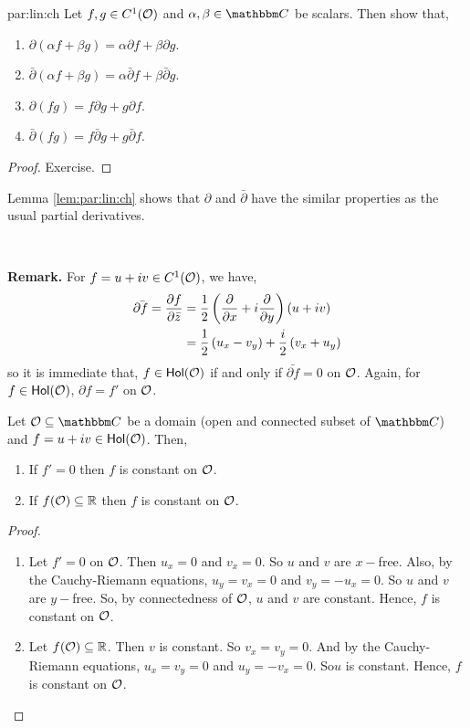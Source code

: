 \documentclass[../ComplexAnalysis_Notes.tex]{subfiles}
\begin{document}
\begin{Lem}{}{par:lin:ch}
  Let \(f, g \in C^1(\mathcal{O})\) and \(\alpha, \beta \in \C\) be scalars. Then show that,
  \begin{enumerate}
    \item \(\partial(\alpha f + \beta g) =  \alpha \partial f + \beta \partial g\).
    \item \(\bar{\partial}(\alpha f + \beta g) =  \alpha \bar{\partial} f + \beta \bar{\partial} g\).
    \item \(\partial(fg) = f \partial g + g \partial f\).
    \item \(\bar{\partial}(fg) = f \bar{\partial} g + g \bar{\partial} f\).
  \end{enumerate}
\end{Lem}
\begin{proof}
  Exercise.
\end{proof}

Lemma \ref{lem:par:lin:ch} shows that \(\partial\) and \(\bar{\partial}\) have the similar properties as the usual partial derivatives.

\

\textbf{Remark.} For \(f = u + iv \in C^1(\mathcal{O})\), we have,
\begin{align*}
  \bar{\partial f} = \pdv{f}{\bar{z}}
   & = \frac 12 \left( \pdv{x} + i \pdv{y} \right)(u + iv)                   \\
   & = \frac 12 \left( u_x - v_y \right) + \frac i2 \left( v_x + u_y \right)
\end{align*}
so it is immediate that, \(f \in \operatorname{\mathsf{Hol}}(\mathcal{O})\) if and only if \(\bar{\partial f} = 0\) on \(\mathcal{O}\). Again, for \(f \in \operatorname{\mathsf{Hol}}(\mathcal{O})\), \(\partial f = f'\) on \(\mathcal{O}\).

\begin{Thm}{}{}
  Let \(\mO \subseteq \C\) be a domain (open and connected subset of \(\C\)) and \(f = u + iv \in \operatorname{\mathsf{Hol}}(\mathcal{O})\). Then,
  \begin{enumerate}
    \item If \(f' = 0\) then \(f\) is constant on \(\mathcal{O}\).
    \item If \(f(\mathcal{O}) \subseteq \mathbb{R}\) then \(f\) is constant on \(\mathcal{O}\).
  \end{enumerate}
\end{Thm}

\begin{proof}
  \begin{enumerate}
    \item Let \(f' = 0\) on \(\mathcal{O}\). Then \(u_x = 0\) and \(v_x = 0\). So \(u\) and \(v\) are \(x-\)free. Also, by the Cauchy-Riemann equations, \(u_y = v_x = 0\) and \(v_y = -u_x = 0\). So \(u\) and \(v\) are \(y-\)free. So, by connectedness of \(\mathcal{O}\), \(u\) and \(v\) are constant. Hence, \(f\) is constant on \(\mathcal{O}\).
    \item Let \(f(\mathcal{O}) \subseteq \mathbb{R}\). Then \(v\) is constant. So \(v_x = v_y = 0\). And by the Cauchy-Riemann equations, \(u_x = v_y = 0\) and \(u_y = -v_x = 0\). So\(u\) is constant. Hence, \(f\) is constant on \(\mathcal{O}\).
  \end{enumerate}
\end{proof}
\end{document}
